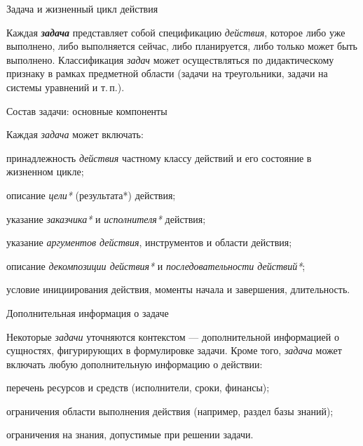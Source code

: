 \begin{frame}{Задача и жизненный цикл действия}
	\topline
	\justifying
	
	Каждая \textbf{\textit{задача}} представляет собой спецификацию \textit{действия}, которое либо уже выполнено, либо выполняется сейчас, либо планируется, либо только может быть выполнено. Классификация \textit{задач} может осуществляться по дидактическому признаку в рамках предметной области (задачи на треугольники, задачи на системы уравнений и т.\,п.).
	
\end{frame}

\begin{frame}{Состав задачи: основные компоненты}
	\topline
	\justifying
	
	\vspace{10mm}
	
	Каждая \textit{задача} может включать:
	\begin{textitemize}
		\item принадлежность \textit{действия} частному классу действий и его состояние в жизненном цикле;
		\item описание \textit{цели*} (результата*) действия;
		\item указание \textit{заказчика*} и \textit{исполнителя*} действия;
		\item указание \textit{аргументов действия\scnrolesign}, инструментов и области действия;
		\item описание \textit{декомпозиции действия*} и \textit{последовательности действий*};
		\item условие инициирования действия, моменты начала и завершения, длительность.
	\end{textitemize}
	
\end{frame}

\begin{frame}{Дополнительная информация о задаче}
	\topline
	\justifying
	
	Некоторые \textit{задачи} уточняются контекстом — дополнительной информацией о сущностях, фигурирующих в формулировке задачи. Кроме того, \textit{задача} может включать любую дополнительную информацию о действии:
	\begin{textitemize}
		\item перечень ресурсов и средств (исполнители, сроки, финансы);
		\item ограничения области выполнения действия (например, раздел базы знаний);
		\item ограничения на знания, допустимые при решении задачи.
	\end{textitemize}
	
\end{frame}

